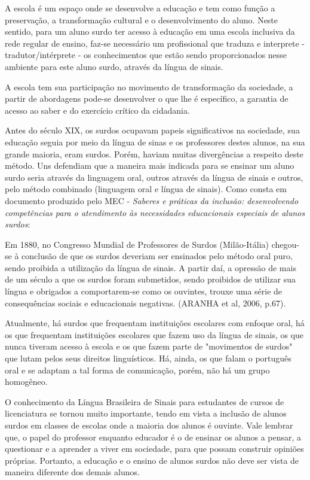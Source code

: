 \documentclass[brasil]{abnt}
\begin{document}
	A escola é um espaço onde se desenvolve a educação e tem como função a preservação, a transformação cultural e o desenvolvimento do aluno. 
	Neste sentido, para um aluno surdo ter acesso à educação em uma escola inclusiva 
	da rede regular de ensino, faz-se necessário um profissional que 
	traduza e interprete - tradutor/intérprete - os conhecimentos que 
	estão sendo proporcionados nesse ambiente para este aluno surdo, através da língua de sinais.
		
	A escola tem sua participação no movimento de transformação da sociedade, a partir de abordagens pode-se desenvolver o que lhe é específico, a garantia de acesso 
	ao saber e do exercício crítico da cidadania. 
	
	Antes do século XIX, os surdos ocupavam papeis significativos na sociedade, sua educação seguia por meio da língua de sinas e os professores destes alunos, na sua grande maioria, eram surdos. Porém, 
	haviam muitas divergências a respeito deste método. Uns defendiam que a maneira mais indicada para se ensinar um aluno surdo seria através da linguagem oral, outros através da língua de sinais e outros, 
	pelo método combinado (linguagem oral e língua de sinais). Como 
	consta em documento produzido pelo MEC - \textit{Saberes e práticas da 
	inclusão: desenvolvendo competências para o atendimento às 
	necessidades educacionais especiais de alunos surdos}:
		
		\begin{citacao} Em 1880, no Congresso Mundial de Professores de Surdos (Milão-Itália) 
						chegou-se à conclusão de que os surdos deveriam ser ensinados pelo método oral puro, sendo proibida a utilização da língua de sinais. A partir daí, a opressão de mais de 
						um século a que os surdos foram submetidos, sendo proibidos de utilizar sua língua e obrigados a comportarem-se como os ouvintes, trouxe uma série de consequências sociais 
						e educacionais negativas. (ARANHA et al, 2006, p.67).
		\end{citacao}

	Atualmente, há surdos que frequentam instituições escolares com enfoque oral, há os que frequentam instituições escolares que fazem uso da língua de sinais, os que nunca tiveram acesso à escola e os 
	que fazem parte de "movimentos de surdos" que lutam pelos seus direitos linguísticos. Há, ainda, os que falam o português oral e se adaptam a tal forma de comunicação, porém, não há um grupo homogêneo. 	
	
	O conhecimento da Língua Brasileira de Sinais para estudantes de cursos de licenciatura se tornou muito importante, tendo em vista a inclusão de alunos surdos em classes de escolas onde a maioria dos alunos é ouvinte. 
	Vale lembrar que, o papel do professor enquanto educador é o de ensinar os alunos a pensar, a questionar e a aprender a viver em sociedade, para que possam construir opiniões próprias. Portanto, a educação e o ensino de
	alunos surdos não deve ser vista de maneira diferente dos demais alunos.
	
\end{document}
